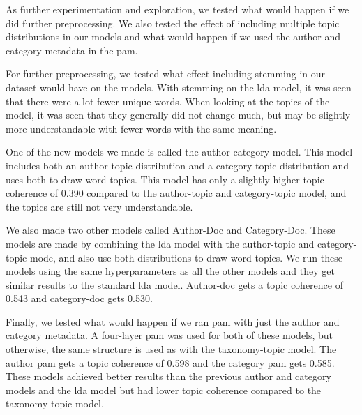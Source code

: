 As further experimentation and exploration, we tested what would happen if we did further preprocessing.
We also tested the effect of including multiple topic distributions in our models and what would happen if we used the author and category metadata in the \gls{pam}.

For further preprocessing, we tested what effect including stemming in our dataset would have on the models.
With stemming on the \gls{lda} model, it was seen that there were a lot fewer unique words.
When looking at the topics of the model, it was seen that they generally did not change much, but may be slightly more understandable with fewer words with the same meaning.

One of the new models we made is called the author-category model.
This model includes both an author-topic distribution and a category-topic distribution and uses both to draw word topics.
This model has only a slightly higher topic coherence of 0.390 compared to the author-topic and category-topic model, and the topics are still not very understandable.

We also made two other models called Author-Doc and Category-Doc.
These models are made by combining the \gls{lda} model with the author-topic and category-topic mode, and also use both distributions to draw word topics.
We run these models using the same hyperparameters as all the other models and they get similar results to the standard \gls{lda} model.
Author-doc gets a topic coherence of 0.543 and category-doc gets 0.530.

Finally, we tested what would happen if we ran \gls{pam} with just the author and category metadata.
A four-layer \gls{pam} was used for both of these models, but otherwise, the same structure is used as with the taxonomy-topic model.
The author \gls{pam} gets a topic coherence of 0.598 and the category \gls{pam} gets 0.585.
These models achieved better results than the previous author and category models and the \gls{lda} model but had lower topic coherence compared to the taxonomy-topic model.
